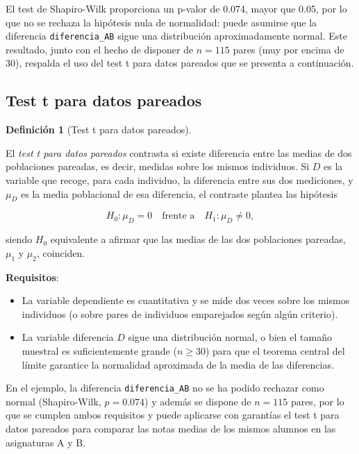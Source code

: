 \documentclass[
  spanish,
  a4paper,
]{scrreport}
\providecommand{\tightlist}{%
  \setlength{\itemsep}{0pt}\setlength{\parskip}{0pt}}
\theoremstyle{definition}
\theoremstyle{definition}
\newtheorem{definition}{Definición}[chapter]
\theoremstyle{remark}
\begin{document}
El test de Shapiro-Wilk proporciona un p-valor de 0.074, mayor que 0.05,
por lo que no se rechaza la hipótesis nula de normalidad: puede asumirse
que la diferencia \texttt{diferencia\_AB} sigue una distribución
aproximadamente normal. Este resultado, junto con el hecho de disponer
de \(n=115\) pares (muy por encima de 30), respalda el uso del test t
para datos pareados que se presenta a continuación.

\subsection{Test t para datos
pareados}\label{test-t-para-datos-pareados}

\begin{definition}[Test t para datos
pareados]\protect\hypertarget{def-dospareadas-t-pareado}{}\label{def-dospareadas-t-pareado}

El \emph{test t para datos pareados} contrasta si existe diferencia
entre las medias de dos poblaciones pareadas, es decir, medidas sobre
los mismos individuos. Si \(D\) es la variable que recoge, para cada
individuo, la diferencia entre sus dos mediciones, y \(\mu_D\) es la
media poblacional de esa diferencia, el contraste plantea las hipótesis

\[H_0: \mu_D = 0 \quad \text{frente a} \quad H_1: \mu_D \neq 0,\]

siendo \(H_0\) equivalente a afirmar que las medias de las dos
poblaciones pareadas, \(\mu_1\) y \(\mu_2\), coinciden.

\end{definition}

\textbf{Requisitos}:

\begin{itemize}
\tightlist
\item
  La variable dependiente es cuantitativa y se mide dos veces sobre los
  mismos individuos (o sobre pares de individuos emparejados según algún
  criterio).
\item
  La variable diferencia \(D\) sigue una distribución normal, o bien el
  tamaño muestral es suficientemente grande (\(n \geq 30\)) para que el
  teorema central del límite garantice la normalidad aproximada de la
  media de las diferencias.
\end{itemize}

En el ejemplo, la diferencia \texttt{diferencia\_AB} no se ha podido
rechazar como normal (Shapiro-Wilk, \(p=0.074\)) y además se dispone de
\(n=115\) pares, por lo que se cumplen ambos requisitos y puede
aplicarse con garantías el test t para datos pareados para comparar las
notas medias de los mismos alumnos en las asignaturas A y B.
\end{document}
